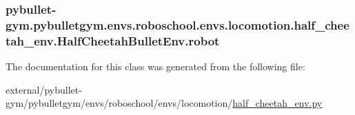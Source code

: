 \subsubsection[{\texorpdfstring{robot}{robot}}]{\setlength{\rightskip}{0pt plus 5cm}pybullet-\/gym.\+pybulletgym.\+envs.\+roboschool.\+envs.\+locomotion.\+half\+\_\+cheetah\+\_\+env.\+Half\+Cheetah\+Bullet\+Env.\+robot}\hypertarget{classpybullet-gym_1_1pybulletgym_1_1envs_1_1roboschool_1_1envs_1_1locomotion_1_1half__cheetah__env_1_1_half_cheetah_bullet_env_a4c41bc1e528f2f2adb2278256849edda}{}\label{classpybullet-gym_1_1pybulletgym_1_1envs_1_1roboschool_1_1envs_1_1locomotion_1_1half__cheetah__env_1_1_half_cheetah_bullet_env_a4c41bc1e528f2f2adb2278256849edda}


The documentation for this class was generated from the following file\+:\begin{DoxyCompactItemize}
\item 
external/pybullet-\/gym/pybulletgym/envs/roboschool/envs/locomotion/\hyperlink{roboschool_2envs_2locomotion_2half__cheetah__env_8py}{half\+\_\+cheetah\+\_\+env.\+py}\end{DoxyCompactItemize}
